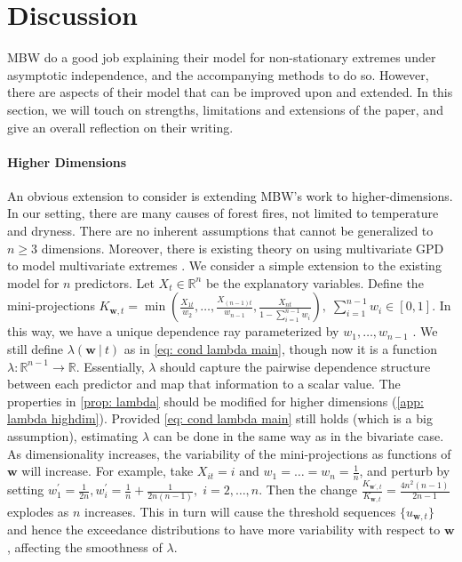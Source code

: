 \documentclass[12pt]{article}
\begin{document}
\section{Discussion}
    MBW do a good job explaining their model for non-stationary extremes under asymptotic independence, and the accompanying methods to do so.
    However, there are aspects of their model that can be improved upon and extended.
    In this section, we will touch on strengths, limitations and extensions of the paper, and give an overall reflection on their writing. 

    \paragraph{Higher Dimensions} An obvious extension to consider is extending MBW's work to higher-dimensions. 
    In our setting, there are many causes of forest fires, not limited to temperature and dryness.
    There are no inherent assumptions that cannot be generalized to $n \geq 3$ dimensions.
    Moreover, there is existing theory on using multivariate GPD to model multivariate extremes \citep{Naveau2024}.
    We consider a simple extension to the existing model for
    $n$ predictors. 
    Let $X_t \in \mathbb{R}^n$ be the explanatory variables.
    Define the mini-projections $K_{\boldsymbol{w}, t} = \min \left(\frac{X_{1t}}{w_2}, \dots, \frac{X_{(n-1)t}}{w_{n - 1}}, \frac{X_{nt}}{1 - \sum_{i = 1}^{n - 1} w_i} 
    \right), \; \sum_{i = 1}^{n - 1} w_i \in [0, 1]$.
    In this way, we have a unique dependence ray parameterized by $w_1,\dots,w_{n - 1}$ .
    We still define $\lambda(\boldsymbol{w} \ |\ t)$ as in \cref{eq: cond lambda main}, though now it is a function $\lambda: \mathbb{R}^{n - 1} \to \mathbb{R}$. 
    Essentially, $\lambda$ should capture the pairwise dependence structure between each predictor and map that information to a scalar value. 
    The properties in \cref{prop: lambda} should be modified for higher dimensions (\cref{app: lambda highdim}).
    Provided  \cref{eq: cond lambda main} still holds (which is a big assumption), estimating $\lambda$ can be done in the same way as in the bivariate case.
    As dimensionality increases, the variability of the mini-projections as functions of $\boldsymbol{w}$ will increase.
    For example, take $X_{it} = i$ and $w_1 = \dots = w_n = \frac{1}{n}$, and perturb by setting $w_1^\prime= \frac{1}{2n}, w_i^\prime = \frac{1}{n} + \frac{1}{2n(n - 1)}, \; i=2,\dots,n$.
    Then the change $\frac{K_{\boldsymbol{w}^\prime, t}}{K_{\boldsymbol{w}, t}} = \frac{4n^2(n - 1)}{ 2n - 1}$ explodes as $n$ increases. This in turn will cause the threshold sequences $\{u_{\boldsymbol{w}, t}\}$ and hence the exceedance distributions to have more variability with respect to $\boldsymbol{w}$, affecting the smoothness of $\lambda$.
 
\end{document}
